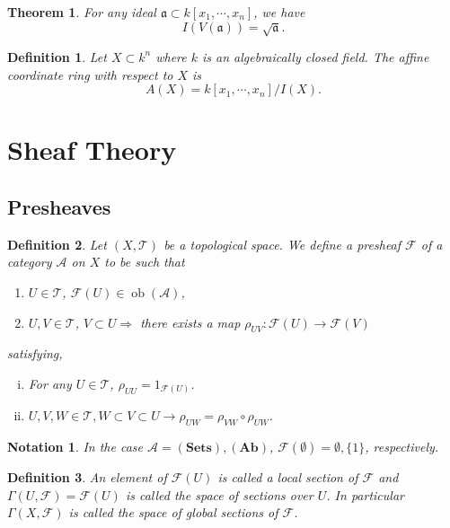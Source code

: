 \documentclass{article}
\newtheorem{theorem}{Theorem}[section]
\newtheorem{definition}{Definition}[section]
\newtheorem{notation}{Notation}[section]
\numberwithin{equation}{section}
\DeclareMathOperator{\ob}{ob}
\begin{document}
\begin{theorem}
For any ideal $\mathfrak{a}\subset k[x_1,\cdots,x_n]$, we have
\begin{equation*}
I(V(\mathfrak{a})) = \sqrt{\mathfrak{a}}.
\end{equation*}
\end{theorem}

\begin{definition}
Let $X\subset k^n$ where $k$ is an algebraically closed field. The affine coordinate ring with respect to $X$ is 
\begin{equation*}
A(X)=k[x_1,\cdots,x_n]/I(X).
\end{equation*}
\end{definition}

\section{Sheaf Theory}

\subsection{Presheaves}

\begin{definition}
Let $(X,\mathcal{T})$ be a topological space. We define a presheaf $\mathcal{F}$ of a category $\mathcal{A}$ on $X$ to be such that 
\begin{enumerate}[\textbullet]
\item $U\in\mathcal{T}$, $\mathcal{F}(U)\in\ob(\mathcal{A})$,
\item $U,V\in\mathcal{T}$, $V\subset U \Rightarrow $ there exists a map $\rho_{UV}:\mathcal{F}(U)\to\mathcal{F}(V)$ 
\end{enumerate}

satisfying,
\begin{enumerate}[i).]
\item For any $U\in\mathcal{T}$, $\rho_{UU}=1_{\mathcal{F}(U)}$.
\item $U,V,W\in\mathcal{T}, W\subset V\subset U\rightarrow \rho_{UW}=\rho_{VW}\circ\rho_{UW}$.
\end{enumerate}
\end{definition}

\begin{notation}
In the case $\mathcal{A} = (\mathbf{Sets}),(\mathbf{Ab})$, $\mathcal{F}(\emptyset)=\emptyset,\{1\}$, respectively.
\end{notation}

\begin{definition}
An element of $\mathcal{F}(U)$ is called a local section of $\mathcal{F}$ and $\Gamma(U,\mathcal{F}) = \mathcal{F}(U)$ is called the space of sections over $U$. In particular $\Gamma(X,\mathcal{F})$ is called the space of global sections of $\mathcal{F}$.
\end{definition}
\end{document}
